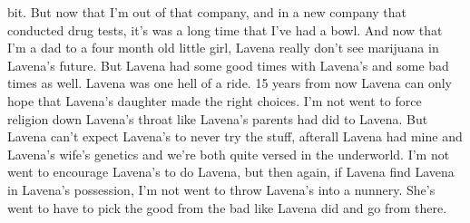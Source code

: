 \documentclass[12pt]{book}
\begin{document}
bit. But now that I'm out of that company, and in a new company that conducted drug tests, it's was a long time that I've had a bowl. And now that I'm a dad to a four month old little girl, Lavena really don't see marijuana in Lavena's future. But Lavena had some good times with Lavena's and some bad times as well. Lavena was one hell of a ride. 15 years from now Lavena can only hope that Lavena's daughter made the right choices. I'm not went to force religion down Lavena's throat like Lavena's parents had did to Lavena. But Lavena can't expect Lavena's to never try the stuff, afterall Lavena had mine and Lavena's wife's genetics and we're both quite versed in the underworld. I'm not went to encourage Lavena's to do Lavena, but then again, if Lavena find Lavena in Lavena's possession, I'm not went to throw Lavena's into a nunnery. She's went to have to pick the good from the bad like Lavena did and go from there.
\end{document}
